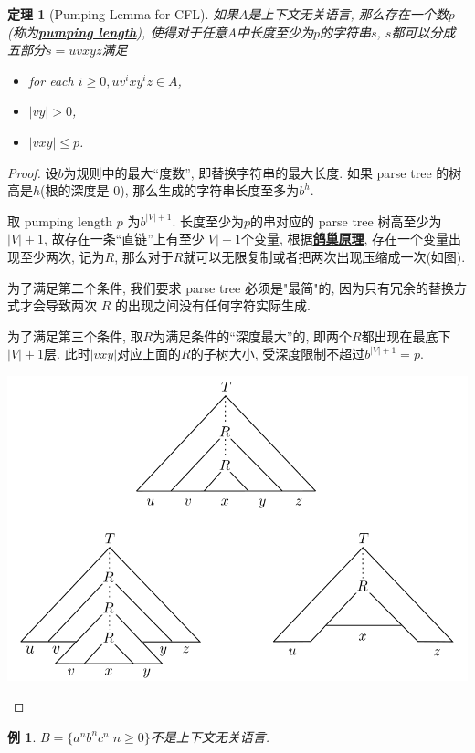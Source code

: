 \documentclass[8pt]{article}
\theoremstyle{compact}
\newtheorem{theorem}{定理}
\newtheorem{example}{例}
\def\obj#1{\textbf{\uline{#1}}}
\def\le{\leqslant}
\def\ge{\geqslant}
\begin{document}
\begin{theorem}[Pumping Lemma for CFL]
	如果$A$是上下文无关语言, 那么存在一个数$p$(称为\obj{pumping length}), 使得对于任意$A$中长度至少为$p$的字符串$s$, $s$都可以分成五部分$s = uvxyz$满足
	\begin{itemize}
		\item for each $i \ge 0, uv^ixy^iz \in A$,
		\item $|vy| > 0$,
		\item $|vxy| \le p$.
	\end{itemize}
\end{theorem}
\begin{proof}
	设$b$为规则中的最大“度数”, 即替换字符串的最大长度. 如果 parse tree 的树高是$h$(根的深度是 $0$), 那么生成的字符串长度至多为$b^h$. 

	取 pumping length $p$ 为$b^{|V|+1}$. 长度至少为$p$的串对应的 parse tree 树高至少为$|V| + 1$, 故存在一条“直链”上有至少$|V| + 1$个变量, 根据\obj{鸽巢原理}, 存在一个变量出现至少两次, 记为$R$, 那么对于$R$就可以无限复制或者把两次出现压缩成一次(如图). 

	为了满足第二个条件, 我们要求 parse tree 必须是"最简"的, 因为只有冗余的替换方式才会导致两次 $R$ 的出现之间没有任何字符实际生成.

	为了满足第三个条件, 取$R$为满足条件的“深度最大”的, 即两个$R$都出现在最底下$|V| + 1$层. 此时$|vxy|$对应上面的$R$的子树大小, 受深度限制不超过$b^{|V| + 1} = p$. 
	\begin{center}
		\includegraphics[scale=0.3]{pic/pumping_for_CFL.png}		
	\end{center}
\end{proof}
\begin{example}
	$B = \{a^nb^nc^n | n \ge 0\}$不是上下文无关语言.
\end{example}
\end{document}
